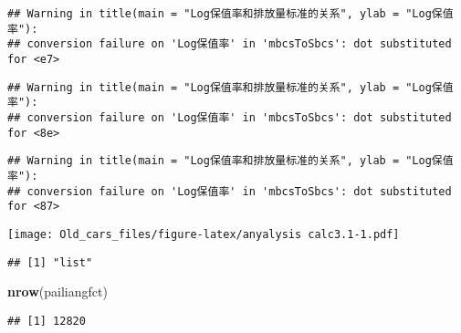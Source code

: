 \documentclass[]{article}
\newenvironment{Shaded}{\begin{snugshade}}{\end{snugshade}}
\newcommand{\KeywordTok}[1]{\textcolor[rgb]{0.13,0.29,0.53}{\textbf{#1}}}
\newcommand{\CommentTok}[1]{\textcolor[rgb]{0.56,0.35,0.01}{\textit{#1}}}
\newcommand{\OperatorTok}[1]{\textcolor[rgb]{0.81,0.36,0.00}{\textbf{#1}}}
\newcommand{\NormalTok}[1]{#1}
\begin{document}
\begin{verbatim}
## Warning in title(main = "Log保值率和排放量标准的关系", ylab = "Log保值率"):
## conversion failure on 'Log保值率' in 'mbcsToSbcs': dot substituted for <e7>
\end{verbatim}

\begin{verbatim}
## Warning in title(main = "Log保值率和排放量标准的关系", ylab = "Log保值率"):
## conversion failure on 'Log保值率' in 'mbcsToSbcs': dot substituted for <8e>
\end{verbatim}

\begin{verbatim}
## Warning in title(main = "Log保值率和排放量标准的关系", ylab = "Log保值率"):
## conversion failure on 'Log保值率' in 'mbcsToSbcs': dot substituted for <87>
\end{verbatim}

\texttt{[image: Old\_cars\_files/figure-latex/anyalysis calc3.1-1.pdf]}

\begin{Shaded}
\end{Shaded}

\begin{verbatim}
## [1] "list"
\end{verbatim}

\begin{Shaded}
\begin{Highlighting}[]
  \KeywordTok{nrow}\NormalTok{(pailiangfct)}
\end{Highlighting}
\end{Shaded}

\begin{verbatim}
## [1] 12820
\end{verbatim}
\end{document}
